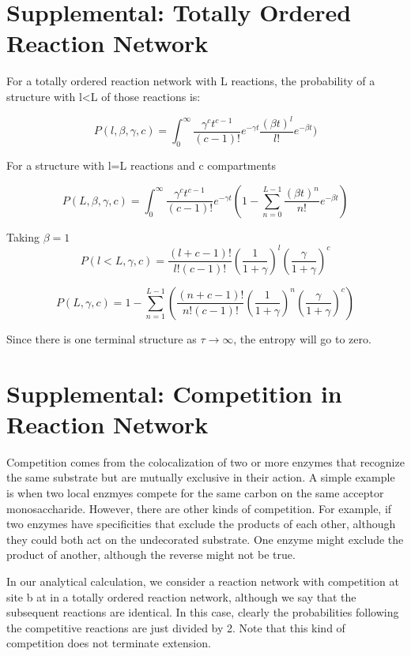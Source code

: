 \documentclass{article}
\begin{document}
\section*{Supplemental: Totally Ordered Reaction Network}

For a totally ordered reaction network with L reactions, the probability of a structure with l<L of those reactions is:

\begin{equation} 
P(l,\beta,\gamma,c)=\int_0^\infty \frac{\gamma^ct^{c-1}}{(c-1)!}e^{-\gamma t}\frac{(\beta t)^l}{l!}e^{-\beta t})
\end{equation}

For a structure with l=L reactions and c compartments

\begin{equation}
P(L,\beta,\gamma,c)=\int_0^\infty \frac{\gamma^ct^{c-1}}{(c-1)!}e^{-\gamma t}(1-\sum_{n=0}^{L-1}\frac{(\beta t)^n}{n!}e^{-\beta t})
\end{equation}

Taking $\beta = 1$
\begin{equation}
P(l<L,\gamma,c)=\frac{(l+c-1)!}{l!(c-1)!}(\frac{1}{1+\gamma})^l(\frac{\gamma}{1+\gamma})^c
\end{equation}

\begin{equation}
P(L,\gamma,c)=1-\sum_{n=1}^{L-1}(\frac{(n+c-1)!}{n!(c-1)!}(\frac{1}{1+\gamma})^n(\frac{\gamma}{1+\gamma})^c)
\end{equation}

Since there is one terminal structure as $\tau \rightarrow\infty$, the entropy will go to zero. 

\section*{Supplemental: Competition in Reaction Network}
Competition comes from the colocalization of two or more enzymes that recognize the same substrate but are mutually exclusive in their action. A simple example is when two local enzmyes compete for the same carbon on the same acceptor monosaccharide. However, there are other kinds of competition. For example, if two enzymes have specificities that exclude the products of each other, although they could both act on the undecorated substrate. One enzyme might exclude the product of another, although the reverse might not be true. 

In our analytical calculation, we consider a reaction network with competition at site b at in a totally ordered reaction network, although we say that the subsequent reactions are identical. In this case, clearly the probabilities following the competitive reactions are just divided by 2. Note that this kind of competition does not terminate extension. 
\end{document}
